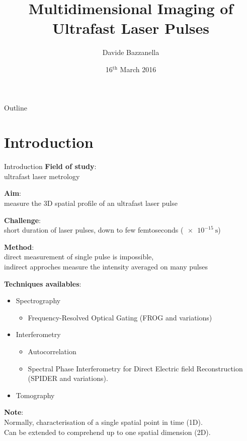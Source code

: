 \documentclass[11pt]{beamer}
\author{Davide Bazzanella}
\title{Multidimensional Imaging of Ultrafast Laser Pulses}
\institute{Imperial College London}
\date{16$^{\mathrm{th}}$ March 2016}
\begin{document}
\begin{frame}
\titlepage
\end{frame}

\begin{frame}{Outline}
\tableofcontents
\end{frame}

\section{Introduction}
\begin{frame}{Introduction}
\textbf{Field of study}:\\
	ultrafast laser metrology
	
\vspace{15pt}
\textbf{Aim}:\\
	measure the 3D spatial profile of an ultrafast laser pulse

\vspace{15pt}
\textbf{Challenge}:\\
	short duration of laser pulses, down to few femtoseconds ($\SI{e-15}{\s}$)
	
\vspace{15pt}
\textbf{Method}:\\
	direct measurement of single pulse is impossible,\\
	indirect approches measure the intensity averaged on many pulses
\end{frame}

\begin{frame}
\textbf{Techniques availables}:\\
\begin{itemize}
\item Spectrography
	\begin{itemize}
		\item Frequency-Resolved Optical Gating (FROG and variations)
	\end{itemize}
\item Interferometry
	\begin{itemize}
		\item Autocorrelation
		\item Spectral Phase Interferometry for Direct Electric field Reconstruction (SPIDER and variations).
	\end{itemize}
	\item Tomography
\end{itemize}

\vspace{15pt}
\textbf{Note}:\\
Normally, characterisation of a single spatial point in time (1D).\\
Can be extended to comprehend up to one spatial dimension (2D).
\end{frame}
\end{document}
